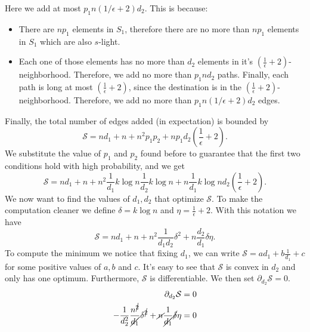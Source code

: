 \documentclass[11pt]{article}
\begin{document}
\begin{enumerate}
\begin{enumerate}
            Here we add at most $p_1n (1/\epsilon + 2)d_2$. This is because:
            \begin{itemize}
                \item There are $np_1$ elements in $S_1$, therefore there are no more than $np_1$ elements in $S_1$ which are also $s$-light.
                \item Each one of those elements has no more than $d_2$ elements in it's $\left(\frac{1}{\epsilon} + 2\right)$-neighborhood. Therefore, we add no more than $p_1nd_2$ paths. Finally, each path is long at most $\left(\frac{1}{\epsilon} + 2\right)$, since the destination is in the $\left(\frac{1}{\epsilon} + 2\right)$-neighborhood. Therefore, we add no more than $p_1n (1/\epsilon + 2)d_2$ edges.
            \end{itemize}
    \end{enumerate}
    Finally, the total number of edges added (in expectation) is bounded by 
    \begin{equation*}
        \mathcal{S} = nd_1 + n + n^2p_1p_2 + np_1d_2\left(\frac{1}{\epsilon}+2\right).
    \end{equation*}
    We substitute the value of $p_1$ and $p_2$ found before to guarantee that the first two conditions hold with high probability, and we get
    \begin{equation*}
        \mathcal{S} = nd_1 + n + n^2\frac{1}{d_1}k\log n\frac{1}{d_2}k\log n + n\frac{1}{d_1}k\log n d_2\left(\frac{1}{\epsilon}+2\right).
    \end{equation*}
    We now want to find the values of $d_1,d_2$ that optimize $\mathcal{S}$. To make the computation cleaner we define $\delta = k\log n$ and $\eta = \frac{1}{\epsilon} + 2$. With this notation we have
    \begin{equation*}
        \mathcal{S} = nd_1 + n + n^2\frac{1}{d_1d_2}\delta ^2 + n\frac{d_2}{d_1}\delta \eta.
    \end{equation*}
    To compute the minimum we notice that fixing $d_1$, we can write $\mathcal{S} = ad_1 + b\frac{1}{d_1} + c$ for some positive values of $a,b$ and $c$. It's easy to see that $\mathcal{S}$ is convex in $d_2$ and only has one optimum. Furthermore, $\mathcal{S}$ is differentiable. We then set $\partial_{d_2}\mathcal{S} = 0$.
    \begin{align*}
        \partial_{d_2}\mathcal{S} &= 0\\
        -\frac{1}{d_2^2}\frac{n^{\cancel{2}}}{\cancel{d_1}}\delta^{\cancel{2}} + \cancel{n}\frac{1}{\cancel{d_1}}\cancel{\delta}\eta&=0\\

\end{align*}
\end{enumerate}
\end{document}
